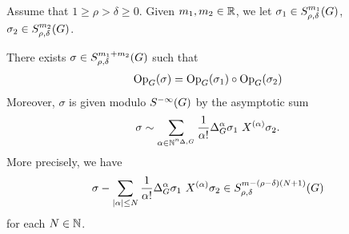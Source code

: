 \begin{theorem}
\label{theorem:composition_formula}
    Assume that $1 \geq \rho > \delta \geq 0$.
    Given $m_1, m_2 \in \mathbb{R}$,
    we let
    $\sigma_1 \in S^{m_1}_{\rho, \delta}(G)$,
    $\sigma_2 \in S^{m_2}_{\rho, \delta}(G)$.

    There exists $\sigma \in S^{m_1 + m_2}_{\rho, \delta}(G)$ such that
    \begin{align*}
        \mathrm{Op}_{G} (\sigma) = \mathrm{Op}_{G}(\sigma_1) \circ \mathrm{Op}_{G}(\sigma_2)
    \end{align*}
    Moreover,
    $\sigma$ is given modulo ${S^{-\infty} (G)}$ by the asymptotic sum
    \begin{align*}
        \sigma \sim
        \sum_{\alpha \in \N^{\dimDifferenceOperators}} \frac 1 {\alpha!} \DifferenceOperatorOrder \alpha \sigma_1 \ \TaylorLeftDifferentialOperator \alpha \sigma_2.
    \end{align*}
    More precisely,
    we have
    \begin{align*}
        \sigma
        - \sum_{\abs \alpha \leq N} \frac 1 {\alpha!} \DifferenceOperatorOrder \alpha \sigma_1 \ \TaylorLeftDifferentialOperator \alpha \sigma_2 \in \SymbolClass {m - (\rho - \delta) (N + 1)} {\rho, \delta}
    \end{align*}
    for each $N \in \mathbb{N}$.
\end{theorem}

